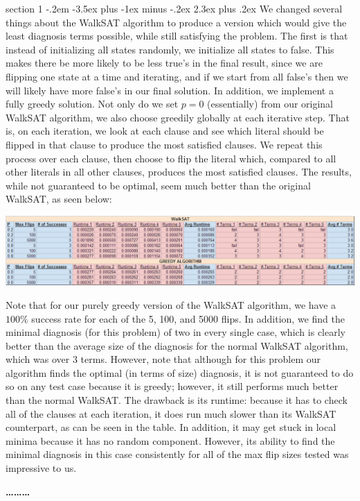 \documentclass[12pt]{article}
\makeatletter
\newenvironment{problem}{\@startsection
       {section}
       {1}
       {-.2em}
       {-3.5ex plus -1ex minus -.2ex}
       {2.3ex plus .2ex}
       {\pagebreak[3] %
       \large\bf\noindent{Problem }
       }
       }
       {%
       \begin{center}\large\bf \ldots\ldots\ldots\end{center}}
\makeatother
\begin{document}
\begin{problem}{}
We changed several things about the WalkSAT algorithm to produce a version which would give the least diagnosis terms possible, while still satisfying the problem. The first is that instead of initializing all states randomly, we initialize all states to false. This makes there be more likely to be less true's in the final result, since we are flipping one state at a time and iterating, and if we start from all false's then we will likely have more false's in our final solution. In addition, we implement a fully greedy solution. Not only do we set $p = 0$ (essentially) from our original WalkSAT algorithm, we also choose greedily globally at each iterative step. That is, on each iteration, we look at each clause and see which literal should be flipped in that clause to produce the most satisfied clauses. We repeat this process over each clause, then choose to flip the literal which, compared to all other literals in all other clauses, produces the most satisfied clauses. The results, while not guaranteed to be optimal, seem much better than the original WalkSAT, as seen below:

\begin{center}
\includegraphics[width=\textwidth]{results.png}
\end{center}

Note that for our purely greedy version of the WalkSAT algorithm, we have a $100\%$ success rate for each of the 5, 100, and 5000 flips. In addition, we find the minimal diagnosis (for this problem) of two in every single case, which is clearly better than the average size of the diagnosis for the normal WalkSAT algorithm, which was over $3$ terms. However, note that although for this problem our algorithm finds the optimal (in terms of size) diagnosis, it is not guaranteed to do so on any test case because it is greedy; however, it still performs much better than the normal WalkSAT. The drawback is its runtime: because it has to check all of the clauses at each iteration, it does run much slower than its WalkSAT counterpart, as can be seen in the table. In addition, it may get stuck in local minima because it has no random component. However, its ability to find the minimal diagnosis in this case consistently for all of the max flip sizes tested was impressive to us.
\end{problem}
\end{document}
